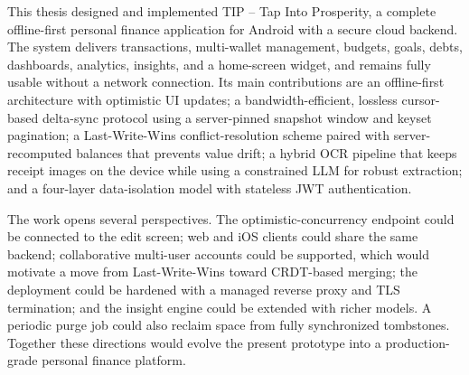 \documentclass[13pt,a4paper]{extarticle}
\begin{document}
This thesis designed and implemented TIP -- Tap Into Prosperity, a complete offline-first personal
finance application for Android with a secure cloud backend. The system delivers transactions,
multi-wallet management, budgets, goals, debts, dashboards, analytics, insights, and a home-screen
widget, and remains fully usable without a network connection. Its main contributions are an
offline-first architecture with optimistic UI updates; a bandwidth-efficient, lossless cursor-based
delta-sync protocol using a server-pinned snapshot window and keyset pagination; a Last-Write-Wins
conflict-resolution scheme paired with server-recomputed balances that prevents value drift; a
hybrid OCR pipeline that keeps receipt images on the device while using a constrained LLM for robust
extraction; and a four-layer data-isolation model with stateless JWT authentication.

The work opens several perspectives. The optimistic-concurrency endpoint could be connected to the
edit screen; web and iOS clients could share the same backend; collaborative multi-user accounts
could be supported, which would motivate a move from Last-Write-Wins toward CRDT-based merging; the
deployment could be hardened with a managed reverse proxy and TLS termination; and the insight
engine could be extended with richer models. A periodic purge job could also reclaim space from
fully synchronized tombstones. Together these directions would evolve the present prototype into a
production-grade personal finance platform.

\end{document}
